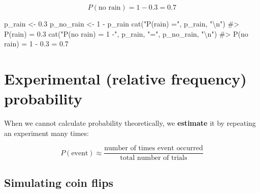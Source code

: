 \documentclass[
  11pt,
  a4paper,
  oneside,
  open=any]{scrbook}
\newenvironment{Shaded}{\begin{snugshade}}{\end{snugshade}}
\newcommand{\CommentTok}[1]{\textcolor[rgb]{0.37,0.37,0.37}{#1}}
\newcommand{\DecValTok}[1]{\textcolor[rgb]{0.68,0.00,0.00}{#1}}
\newcommand{\FloatTok}[1]{\textcolor[rgb]{0.68,0.00,0.00}{#1}}
\newcommand{\FunctionTok}[1]{\textcolor[rgb]{0.28,0.35,0.67}{#1}}
\newcommand{\NormalTok}[1]{\textcolor[rgb]{0.00,0.23,0.31}{#1}}
\newcommand{\OtherTok}[1]{\textcolor[rgb]{0.00,0.23,0.31}{#1}}
\newcommand{\SpecialCharTok}[1]{\textcolor[rgb]{0.37,0.37,0.37}{#1}}
\newcommand{\StringTok}[1]{\textcolor[rgb]{0.13,0.47,0.30}{#1}}
\begin{document}
\[P(\text{no rain}) = 1 - 0.3 = 0.7\]

\begin{Shaded}
\begin{Highlighting}[]
\NormalTok{p\_rain }\OtherTok{\textless{}{-}} \FloatTok{0.3}
\NormalTok{p\_no\_rain }\OtherTok{\textless{}{-}} \DecValTok{1} \SpecialCharTok{{-}}\NormalTok{ p\_rain}
\FunctionTok{cat}\NormalTok{(}\StringTok{"P(rain) ="}\NormalTok{, p\_rain, }\StringTok{"}\SpecialCharTok{\textbackslash{}n}\StringTok{"}\NormalTok{)}
\CommentTok{\#\textgreater{} P(rain) = 0.3}
\FunctionTok{cat}\NormalTok{(}\StringTok{"P(no rain) = 1 {-}"}\NormalTok{, p\_rain, }\StringTok{"="}\NormalTok{, p\_no\_rain, }\StringTok{"}\SpecialCharTok{\textbackslash{}n}\StringTok{"}\NormalTok{)}
\CommentTok{\#\textgreater{} P(no rain) = 1 {-} 0.3 = 0.7}
\end{Highlighting}
\end{Shaded}

\section{Experimental (relative frequency)
probability}\label{experimental-relative-frequency-probability}

When we cannot calculate probability theoretically, we \textbf{estimate}
it by repeating an experiment many times:

\[P(\text{event}) \approx \frac{\text{number of times event occurred}}{\text{total number of trials}}\]

\subsection{Simulating coin flips}\label{simulating-coin-flips}
\end{document}
